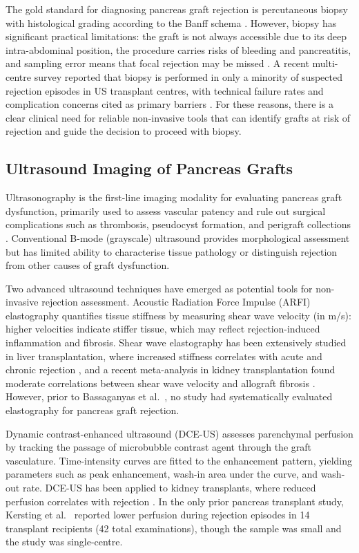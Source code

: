 The gold standard for diagnosing pancreas graft rejection is percutaneous biopsy with histological grading according to the Banff schema \cite{drachenberg2008}. However, biopsy has significant practical limitations: the graft is not always accessible due to its deep intra-abdominal position, the procedure carries risks of bleeding and pancreatitis, and sampling error means that focal rejection may be missed \cite{klassen2002, singh2024}. A recent multi-centre survey reported that biopsy is performed in only a minority of suspected rejection episodes in US transplant centres, with technical failure rates and complication concerns cited as primary barriers \cite{singh2024}. For these reasons, there is a clear clinical need for reliable non-invasive tools that can identify grafts at risk of rejection and guide the decision to proceed with biopsy.

\subsection{Ultrasound Imaging of Pancreas Grafts}

Ultrasonography is the first-line imaging modality for evaluating pancreas graft dysfunction, primarily used to assess vascular patency and rule out surgical complications such as thrombosis, pseudocyst formation, and perigraft collections \cite{monelli2019}. Conventional B-mode (grayscale) ultrasound provides morphological assessment but has limited ability to characterise tissue pathology or distinguish rejection from other causes of graft dysfunction.

Two advanced ultrasound techniques have emerged as potential tools for non-invasive rejection assessment. Acoustic Radiation Force Impulse (ARFI) elastography quantifies tissue stiffness by measuring shear wave velocity (in m/s): higher velocities indicate stiffer tissue, which may reflect rejection-induced inflammation and fibrosis. Shear wave elastography has been extensively studied in liver transplantation, where increased stiffness correlates with acute and chronic rejection \cite{yoon2013}, and a recent meta-analysis in kidney transplantation found moderate correlations between shear wave velocity and allograft fibrosis \cite{filipov2024}. However, prior to Bassaganyas et al.\ \cite{bassaganyas2025}, no study had systematically evaluated elastography for pancreas graft rejection.

Dynamic contrast-enhanced ultrasound (DCE-US) assesses parenchymal perfusion by tracking the passage of microbubble contrast agent through the graft vasculature. Time-intensity curves are fitted to the enhancement pattern, yielding parameters such as peak enhancement, wash-in area under the curve, and wash-out rate. DCE-US has been applied to kidney transplants, where reduced perfusion correlates with rejection \cite{jin2015, kersting2013}. In the only prior pancreas transplant study, Kersting et al.\ \cite{kersting2013} reported lower perfusion during rejection episodes in 14 transplant recipients (42 total examinations), though the sample was small and the study was single-centre.

